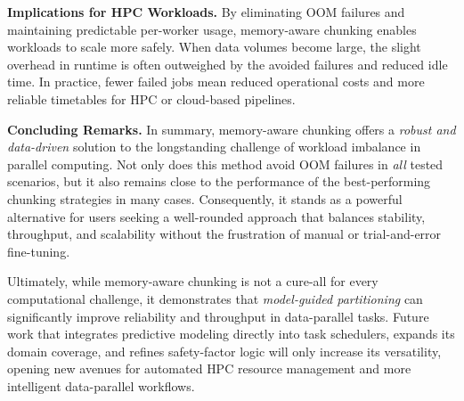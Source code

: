 \vspace{6pt}
\noindent
\textbf{Implications for \ac{HPC} Workloads.}
By eliminating \ac{OOM} failures and maintaining predictable per-worker usage, memory-aware chunking enables workloads to scale more safely.
When data volumes become large, the slight overhead in runtime is often outweighed by the avoided failures and reduced idle time.
In practice, fewer failed jobs mean reduced operational costs and more reliable timetables for \ac{HPC} or cloud-based pipelines.

\vspace{6pt}
\noindent
\textbf{Concluding Remarks.}
In summary, memory-aware chunking offers a \emph{robust and data-driven} solution to the longstanding challenge of workload imbalance in parallel computing.
Not only does this method avoid \ac{OOM} failures in \emph{all} tested scenarios, but it also remains close to the performance of the best-performing chunking strategies in many cases.
Consequently, it stands as a powerful alternative for users seeking a well-rounded approach that balances stability, throughput, and scalability without the frustration of manual or trial-and-error fine-tuning.

Ultimately, while memory-aware chunking is not a cure-all for every computational challenge, it demonstrates that \emph{model-guided partitioning} can significantly improve reliability and throughput in data-parallel tasks.
Future work that integrates predictive modeling directly into task schedulers, expands its domain coverage, and refines safety-factor logic will only increase its versatility, opening new avenues for automated \ac{HPC} resource management and more intelligent data-parallel workflows.